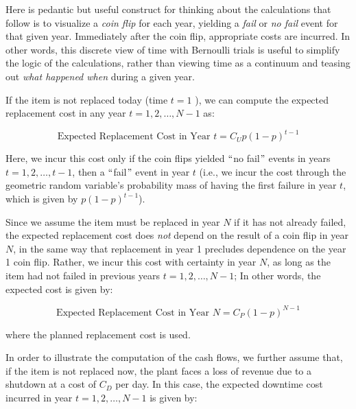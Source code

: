 Here is pedantic but useful construct for thinking about the calculations that follow
is to visualize a {\it coin flip}  for each year, yielding a {\it fail}  or {\it no fail}
event for that given year. Immediately after the coin flip, appropriate costs are incurred.
In other words, this discrete view of time with Bernoulli trials is useful to simplify the
logic of the calculations, rather than viewing time as a continuum and teasing
out {\it what happened when} during a given year.

If the item is not replaced today (time  \( t=1 \) ), we can compute the expected
replacement cost in any year  \( t=1, 2, \ldots ,N-1 \)  as:\par



\begin{equation}\label{npv_1}
\mbox{Expected Replacement Cost in Year } t=C_{U}p \left( 1-p \right) ^{t-1}
\end{equation}


Here, we incur this cost only if the coin flips yielded $``$no fail$"$  events in
years  \( t=1, 2, \ldots ,t-1 \), then a $``$fail$"$  event in year  \( t \)
(i.e., we incur the cost through the geometric random variable’s probability mass of having
the first failure in year  \( t \), which is given by  \( p \left( 1-p \right) ^{t-1} \)).

Since we assume the item must be replaced in year  \( N \)  if it has not already failed,
the expected replacement cost does \textit{not} depend on the result of a coin flip
in year  \( N \), in the same way that replacement in year 1 precludes dependence on
the year 1 coin flip. Rather, we incur this cost with certainty in year  \( N \),
as long as the item had not failed in previous years
\(  t=1, 2, \ldots ,N-1 \); In other words, the expected cost is given by:\par


\begin{equation}\label{npv_2}
\mbox{Expected Replacement Cost in Year }N=C_{P} \left( 1-p \right) ^{N-1}
\end{equation}

where the planned replacement cost is used.

In order to illustrate the computation of the cash flows, we further assume that,
if the item is not replaced now, the plant faces a loss of revenue due to a shutdown
at a cost of  \( C_{D} \)  per day. In this case, the expected downtime cost incurred in
year  \( t=1, 2, \ldots ,N-1 \)  is given by:\par

